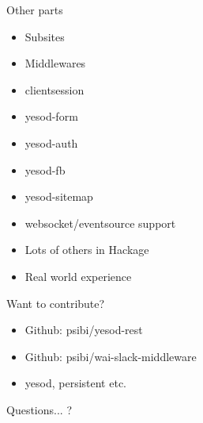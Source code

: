 \documentclass{beamer}
\begin{document}
\begin{frame}{Other parts}
  \begin{itemize}
\item Subsites
\item Middlewares
\item clientsession
\item yesod-form
\item yesod-auth
\item yesod-fb
\item yesod-sitemap  
\item websocket/eventsource support
\item Lots of others in Hackage
\item Real world experience
  \end{itemize}
\end{frame}

\begin{frame}{Want to contribute?}
  \begin{itemize}
  \item Github: psibi/yesod-rest \href{https://github.com/psibi/yesod-rest}{}
  \item Github: psibi/wai-slack-middleware \href{https://github.com/psibi/wai-slack-middleware}{}
  \item yesod, persistent etc.
  \end{itemize}

  \hfill \break
  \hfill \break
  \hfill \break
  \hfill \break
  Questions... ?
\end{frame}
\end{document}
